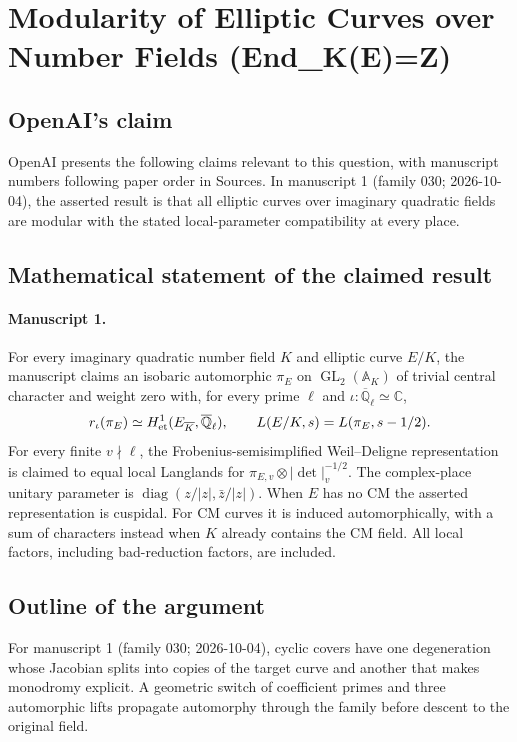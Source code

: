 \documentclass[11pt]{article}
\begin{document}
\section*{Modularity of Elliptic Curves over Number Fields (End\_K(E)=Z)}

\subsection{OpenAI's claim}
OpenAI presents the following claims relevant to this question, with manuscript numbers following paper order in Sources. In manuscript 1 (family 030; 2026-10-04), the asserted result is that all elliptic curves over imaginary quadratic fields are modular with the stated local-parameter compatibility at every place.

\subsection{Mathematical statement of the claimed result}
\paragraph{Manuscript 1.}
For every imaginary quadratic number field $K$ and elliptic curve $E/K$, the manuscript claims an isobaric automorphic $\pi_E$ on $\operatorname{GL}_2(\mathbb A_K)$ of trivial central character and weight zero with, for every prime $\ell$ and $\iota:\overline{\mathbb Q}_{\ell}\simeq\mathbb C$,
\[
 r_{\iota}(\pi_E)\simeq H^1_{\rm et}(E_{\overline K},\overline{\mathbb Q}_{\ell}),\qquad
 L(E/K,s)=L(\pi_E,s-1/2).
\]
For every finite $v\nmid\ell$, the Frobenius-semisimplified Weil--Deligne representation is claimed to equal local Langlands for $\pi_{E,v}\otimes|\det|_v^{-1/2}$. The complex-place unitary parameter is $\operatorname{diag}(z/|z|,\bar z/|z|)$. When $E$ has no CM the asserted representation is cuspidal. For CM curves it is induced automorphically, with a sum of characters instead when $K$ already contains the CM field. All local factors, including bad-reduction factors, are included.

\subsection{Outline of the argument}
For manuscript 1 (family 030; 2026-10-04), cyclic covers have one degeneration whose Jacobian splits into copies of the target curve and another that makes monodromy explicit. A geometric switch of coefficient primes and three automorphic lifts propagate automorphy through the family before descent to the original field.
\end{document}
